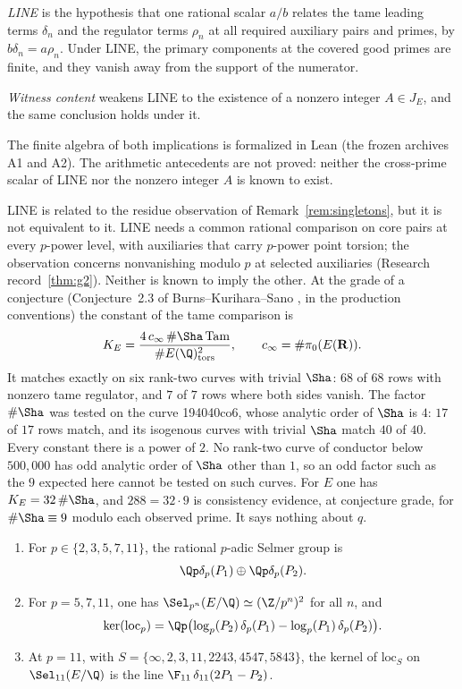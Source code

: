 \begin{researchrecord}\label{thm:line}
\emph{LINE} is the hypothesis that one rational scalar $a/b$ relates the tame leading terms $\delta_n$ and the regulator terms $\rho_n$ at all required auxiliary pairs and primes, by $b\delta_n=a\rho_n$. Under LINE, the primary components at the covered good primes are finite, and they vanish away from the support of the numerator.

\emph{Witness content} weakens LINE to the existence of a nonzero integer $A\in J_E$, and the same conclusion holds under it.
\end{researchrecord}
The finite algebra of both implications is formalized in Lean (the frozen archives A1 and A2). The arithmetic antecedents are not proved: neither the cross-prime scalar of LINE nor the nonzero integer $A$ is known to exist.

LINE is related to the residue observation of Remark~\ref{rem:singletons}, but it is not equivalent to it. LINE needs a common rational comparison on core pairs at every $p$-power level, with auxiliaries that carry $p$-power point torsion; the observation concerns nonvanishing modulo $p$ at selected auxiliaries (Research record~\ref{thm:g2}). Neither is known to imply the other. At the grade of a conjecture (Conjecture~2.3 of Burns--Kurihara--Sano \cite{bks}, in the production conventions) the constant of the tame comparison is
\[
K_E=\frac{4\,c_\infty\,\#\Sha\,\mathrm{Tam}}{\#E(\Q)_{\mathrm{tors}}^2},\qquad c_\infty=\#\pi_0(E(\mathbf{R})).
\]
It matches exactly on six rank-two curves with trivial $\Sha$: $68$ of $68$ rows with nonzero tame regulator, and $7$ of $7$ rows where both sides vanish. The factor $\#\Sha$ was tested on the curve 194040co6, whose analytic order of $\Sha$ is $4$: $17$ of $17$ rows match, and its isogenous curves with trivial $\Sha$ match $40$ of $40$. Every constant there is a power of $2$. No rank-two curve of conductor below $500{,}000$ has odd analytic order of $\Sha$ other than $1$, so an odd factor such as the $9$ expected here cannot be tested on such curves. For $E$ one has $K_E=32\,\#\Sha$, and $288=32\cdot9$ is consistency evidence, at conjecture grade, for $\#\Sha\equiv9$ modulo each observed prime. It says nothing about $q$.

\begin{proposition}\label{prop:localsel}
\begin{enumerate}[label=(\roman*)]
\item For $p\in\{2,3,5,7,11\}$, the rational $p$-adic Selmer group is\[\Qp\delta_p(P_1)\oplus\Qp\delta_p(P_2).\]
\item For $p=5,7,11$, one has $\Sel_{p^n}(E/\Q)\simeq(\Z/p^n)^2$ for all $n$, and
\[
\ker(\mathrm{loc}_p)=\Qp\bigl(\log_p(P_2)\,\delta_p(P_1)-\log_p(P_1)\,\delta_p(P_2)\bigr).
\]
\item At $p=11$, with $S=\{\infty,2,3,11,2243,4547,5843\}$, the kernel of $\mathrm{loc}_S$ on $\Sel_{11}(E/\Q)$ is the line $\F_{11}\,\delta_{11}(2P_1-P_2)$.
\end{enumerate}
\end{proposition}


